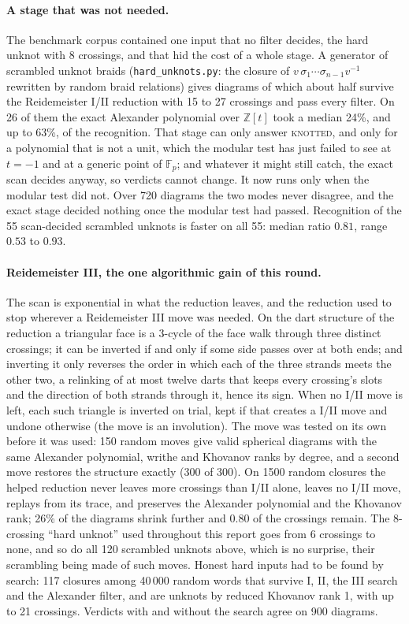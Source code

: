 \paragraph{A stage that was not needed.} The benchmark corpus contained one
input that no filter decides, the hard unknot with 8 crossings, and that hid
the cost of a whole stage. A generator of scrambled unknot braids
(\texttt{hard\_unknots.py}: the closure of $v\,\sigma_1\cdots\sigma_{n-1}v^{-1}$
rewritten by random braid relations) gives diagrams of which about half survive
the Reidemeister I/II reduction with 15 to 27 crossings and pass every filter.
On 26 of them the exact Alexander polynomial over $\mathbb Z[t]$ took a median
24\%, and up to 63\%, of the recognition. That stage can only answer
\textsc{knotted}, and only for a polynomial that is not a unit, which the
modular test has just failed to see at $t=-1$ and at a generic point of
$\mathbb F_p$; and whatever it might still catch, the exact scan decides anyway,
so verdicts cannot change. It now runs only when the modular test did not. Over
720 diagrams the two modes never disagree, and the exact stage decided nothing
once the modular test had passed. Recognition of the 55 scan-decided scrambled
unknots is faster on all 55: median ratio $0.81$, range $0.53$ to $0.93$.

\paragraph{Reidemeister III, the one algorithmic gain of this round.} The scan
is exponential in what the reduction leaves, and the reduction used to stop
wherever a Reidemeister III move was needed. On the dart structure of the
reduction a triangular face is a 3-cycle of the face walk through three
distinct crossings; it can be inverted if and only if some side passes over at
both ends; and inverting it only reverses the order in which each of the three
strands meets the other two, a relinking of at most twelve darts that keeps
every crossing's slots and the direction of both strands through it, hence its
sign. When no I/II move is left, each such triangle is inverted on trial, kept
if that creates a I/II move and undone otherwise (the move is an involution).
The move was tested on its own before it was used: 150 random moves give valid
spherical diagrams with the same Alexander polynomial, writhe and Khovanov ranks
by degree, and a second move restores the structure exactly (300 of 300). On
1500 random closures the helped reduction never leaves more crossings than I/II
alone, leaves no I/II move, replays from its trace, and preserves the Alexander
polynomial and the Khovanov rank; 26\% of the diagrams shrink further and
$0.80$ of the crossings remain. The 8-crossing ``hard unknot'' used throughout
this report goes from 6 crossings to none, and so do all 120 scrambled unknots
above, which is no surprise, their scrambling being made of such moves. Honest
hard inputs had to be found by search: 117 closures among 40\,000 random words
that survive I, II, the III search and the Alexander filter, and are unknots by
reduced Khovanov rank 1, with up to 21 crossings. Verdicts with and without the
search agree on 900 diagrams.

